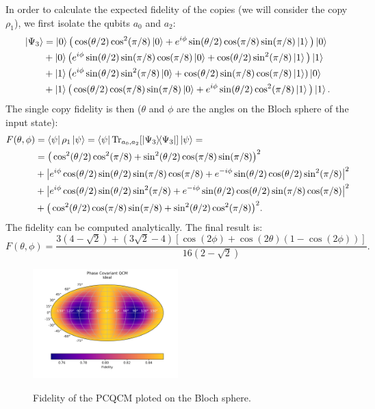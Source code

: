 In order to calculate the expected fidelity of the copies (we will consider the copy $\rho_{1}$), we first isolate the qubits $a_0$ and $a_2$:
\[
    \begin{split}
    \ket{\Psi_3}&=\ket{0}\big(\cos(\theta/2)\cos^2(\pi/8)\ket{0}+e^{i\phi}\sin(\theta/2)\cos(\pi/8)\sin(\pi/8)\ket{1}\big)\ket{0}\\
    &+\ket{0}\big(e^{i\phi}\sin(\theta/2)\sin(\pi/8)\cos(\pi/8)\ket{0}+\cos(\theta/2)\sin^2(\pi/8)\ket{1}\big)\ket{1}\\
    &+\ket{1}\big(e^{i\phi}\sin(\theta/2)\sin^2(\pi/8)\ket{0}+\cos(\theta/2)\sin(\pi/8)\cos(\pi/8)\ket{1})\ket{0}\\
    &+\ket{1}\big(\cos(\theta/2)\cos(\pi/8)\sin(\pi/8)\ket{0}+e^{i\phi}\sin(\theta/2)\cos^2(\pi/8)\ket{1}\big)\ket{1}.
    \end{split}
\]
The single copy fidelity is then ($\theta$ and $\phi$ are the angles on the Bloch sphere of the input state):
\[
    \begin{split}
    F(\theta,\phi)&=\bra{\psi}\rho_{1}\ket{\psi}=\bra{\psi}\Tr_{a_0,a_2}[\ketbra{\Psi_3}]\ket{\psi}=\\
    &=\big(\cos^2(\theta/2)\cos^2(\pi/8)+\sin^2(\theta/2)\cos(\pi/8)\sin(\pi/8)\big)^2\\
    &+\big|e^{i\phi}\cos(\theta/2)\sin(\theta/2)\sin(\pi/8)\cos(\pi/8)+e^{-i\phi}\sin(\theta/2)\cos(\theta/2)\sin^2(\pi/8)\big|^2\\
    &+\big|e^{i\phi}\cos(\theta/2)\sin(\theta/2)\sin^2(\pi/8)+e^{-i\phi}\sin(\theta/2)\cos(\theta/2)\sin(\pi/8)\cos(\pi/8)\big|^2\\
    &+\big(\cos^2(\theta/2)\cos(\pi/8)\sin(\pi/8)+\sin^2(\theta/2)\cos^2(\pi/8)\big)^2.
    \end{split}
\]
The fidelity can be computed analytically. The final result is:
\begin{equation}
    F(\theta,\phi)=\frac{3\left(4-\sqrt{2}\right)+\left(3\sqrt{2}-4\right)\left[\cos(2\phi)+\cos(2\theta)\left(1-\cos(2\phi)\right)\right]}{     16(2-\sqrt{2})   }.
\end{equation}
\begin{figure}[H]
    \centering
            \includegraphics[width=0.5\textwidth]{Figures/phase_covariant.png}
        \label{fig:phase_covariant}
        \caption{Fidelity of the PCQCM ploted on the Bloch sphere.}
\end{figure}
